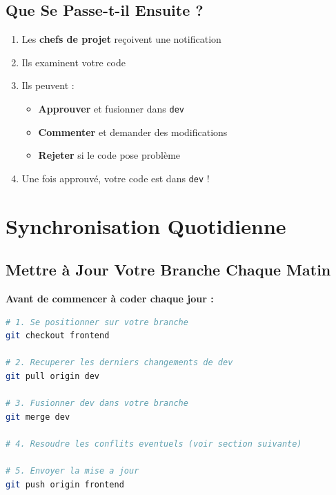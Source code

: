\documentclass[11pt,a4paper]{article}
\begin{document}
\subsection{Que Se Passe-t-il Ensuite ?}

\begin{info}
\begin{enumerate}
    \item Les \textbf{chefs de projet} reçoivent une notification
    \item Ils examinent votre code
    \item Ils peuvent :
    \begin{itemize}
        \item {} \textbf{Approuver} et fusionner dans \texttt{dev}
        \item {} \textbf{Commenter} et demander des modifications
        \item {} \textbf{Rejeter} si le code pose problème
    \end{itemize}
    \item Une fois approuvé, votre code est dans \texttt{dev} !
\end{enumerate}
\end{info}

\clearpage

\section{Synchronisation Quotidienne}
\label{sec:synchronisation}

\subsection{Mettre à Jour Votre Branche Chaque Matin}

\textbf{Avant de commencer à coder chaque jour :}

\begin{lstlisting}[language=bash]
# 1. Se positionner sur votre branche
git checkout frontend

# 2. Recuperer les derniers changements de dev
git pull origin dev

# 3. Fusionner dev dans votre branche
git merge dev

# 4. Resoudre les conflits eventuels (voir section suivante)

# 5. Envoyer la mise a jour
git push origin frontend
\end{lstlisting}
\end{document}
